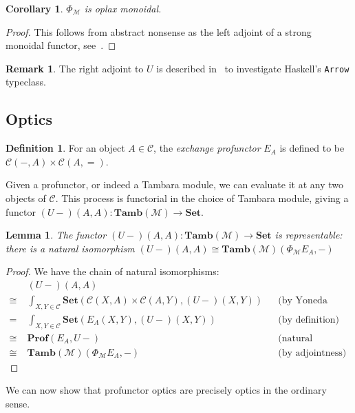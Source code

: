 \documentclass[11pt,letterpaper]{article}
\theoremstyle{plain}
\newtheorem{lemma}[theorem]{Lemma}
\newtheorem{corollary}[theorem]{Corollary}
\theoremstyle{definition}
\newtheorem{definition}[theorem]{Definition}
\newtheorem{remark}[theorem]{Remark}
\newcommand{\C}{\mathscr{C}}
\newcommand{\M}{\mathscr{M}}
\newcommand{\Pastro}{\Phi}
\newcommand{\Set}{\mathbf{Set}}
\newcommand{\Prof}{\mathbf{Prof}}
\newcommand{\Tamb}{\mathbf{Tamb}}
\begin{document}
\begin{corollary}
  $\Pastro_\M$ is oplax monoidal.
\end{corollary}
\begin{proof}
  This follows from abstract nonsense as the left adjoint of a strong monoidal functor, see~\cite{Kelly1974}.
\end{proof}

\begin{remark}
  The right adjoint to $U$ is described in~\cite{NotionsOfComputationAsMonoids} to investigate Haskell's \texttt{Arrow} typeclass.
\end{remark}

\subsection{Optics}
\begin{definition}
  For an object $A \in \C$, the \emph{exchange profunctor} $E_A$ is defined to be $\C(-, A) \times \C(A, {=})$.
\end{definition}

Given a profunctor, or indeed a Tambara module, we can evaluate it at any two objects of $\C$. This process is functorial in the choice of Tambara module, giving a functor $(U-)(A,A) : \Tamb(\M) \to \Set$.

\begin{lemma}\label{lemma-rep}
  The functor $(U-)(A,A) : \Tamb(\M) \to \Set$ is representable: there is a natural isomorphism
  $(U-)(A,A) \cong \Tamb(\M)(\Pastro_\M E_A, -)$
\end{lemma}
\begin{proof}
  We have the chain of natural isomorphisms:
  \begin{align*}
    &(U-)(A,A) \\
    \cong \;&\int_{X,Y \in \C} \Set(\C(X,A) \times \C(A,Y), (U-)(X,Y)) && \text{(by Yoneda reduction twice)} \\
    =\;&\int_{X,Y \in \C} \Set(E_A(X,Y), (U-)(X,Y)) && \text{(by definition)}\\
    \cong \;&\Prof(E_A, U-) && \text{(natural transformations as ends)} \\
    \cong \;&\Tamb(\M)(\Pastro_\M E_A, -) && \text{(by adjointness)}
  \end{align*}
\end{proof}

We can now show that profunctor optics are precisely optics in the ordinary sense.
\end{document}
